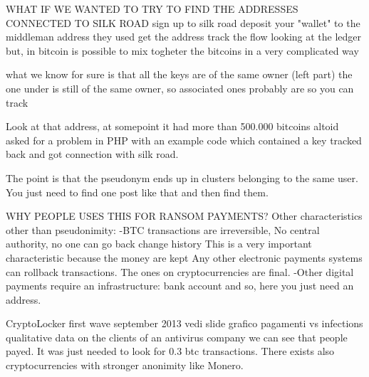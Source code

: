         WHAT IF WE WANTED TO TRY TO FIND THE ADDRESSES CONNECTED TO SILK ROAD
            sign up to silk road 
            deposit your "wallet" to the middleman address they used
            get the address
            track the flow looking at the ledger
            but, in bitcoin is possible to mix togheter the bitcoins in a very complicated way 

            what we know for sure is that all the keys are of the same owner (left part)
            the one under is still of the same owner, so associated ones probably are
            so you can track 

            Look at that address, at somepoint it had more than 500.000 bitcoins
            altoid asked for a problem in PHP with an example code which contained a key
            tracked back and got connection with silk road.

        The point is that the pseudonym ends up in clusters belonging to the same user. You just need to find one post like that and then find them.

    WHY PEOPLE USES THIS FOR RANSOM PAYMENTS?
        Other characteristics other than pseudonimity:
            -BTC transactions are irreversible, No central authority, no one can go back change history
                This is a very important characteristic because the money are kept 
                Any other electronic payments systems can rollback transactions.
                The ones on cryptocurrencies are final.
            -Other digital payments require an infrastructure: bank account and so, here you just need an address.

    CryptoLocker
        first wave september 2013
        vedi slide 
        grafico pagamenti vs infections 
        qualitative data on the clients of an antivirus company 
        we can see that people payed. It was just needed to look for 0.3 btc transactions.
    There exists also cryptocurrencies with stronger anonimity like Monero.
\fi